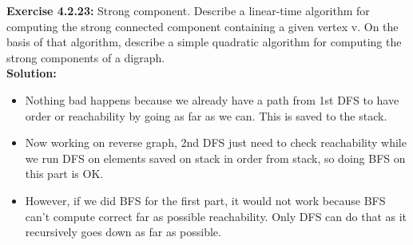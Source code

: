 \documentclass[11pt,fleqn]{article}
\begin{document}
\textbf{Exercise 4.2.23:} Strong component. Describe a linear-time algorithm for computing the strong
connected component containing a given vertex v. On the basis of that algorithm, describe
a simple quadratic algorithm for computing the strong components of a digraph.\\

\textbf{Solution:}\\
\begin{itemize}
	\item Nothing bad happens because we already have a path from 1st DFS to have order or reachability by going as far as we can. This is saved to the stack.

	\item Now working on reverse graph, 2nd DFS just need to check reachability while we run DFS on elements saved on stack in order from stack, so doing BFS on this part is OK.
	
	\item However, if we did BFS for the first part, it would not work because BFS can't compute correct far as possible reachability. Only DFS can do that as it recursively goes down as far as possible.
\end{itemize}


	
\end{document}
